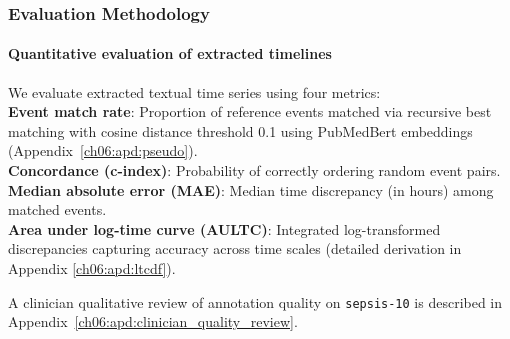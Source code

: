 \subsubsection{Evaluation Methodology}
\ChSixHeadingOnly
\paragraph{Quantitative evaluation of extracted timelines}
\label{ch06:sec:evaluation_methodology_metrics}
We evaluate extracted textual time series using four metrics:\\
\textbf{Event match rate}: Proportion of reference events matched via recursive best matching with cosine distance threshold 0.1 using PubMedBert embeddings (Appendix~\ref{ch06:apd:pseudo}).\\
\textbf{Concordance (c-index)}: Probability of correctly ordering random event pairs.\\
\textbf{Median absolute error (MAE)}: Median time discrepancy (in hours) among matched events.\\
\textbf{Area under log-time curve (AULTC)}: Integrated log-transformed discrepancies capturing accuracy across time scales (detailed derivation in Appendix \ref{ch06:apd:ltcdf}).

A clinician qualitative review of annotation quality on \texttt{sepsis-10} is described in Appendix~\ref{ch06:apd:clinician_quality_review}.








